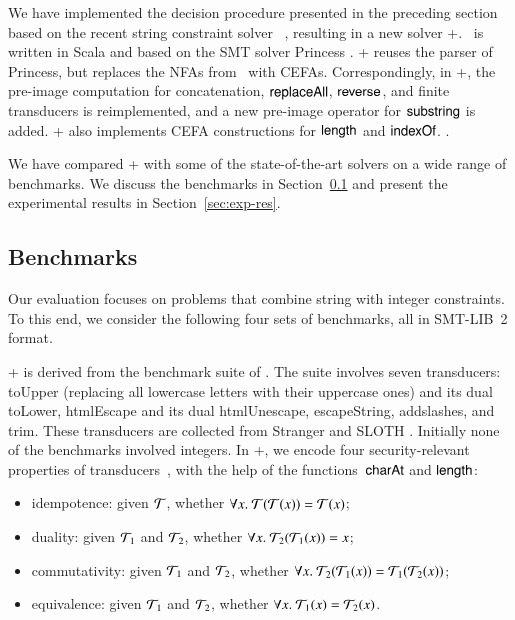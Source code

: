 
We have implemented the decision procedure presented in the preceding section based on the recent string constraint solver \ostrich~\cite{CHL+19}, resulting in a new solver \ostrich+. \ostrich\ is  written in Scala and based on the SMT solver Princess \cite{princess08}. \ostrich+ reuses the parser of Princess, but replaces the NFAs from \ostrich\ with CEFAs. Correspondingly, in \ostrich+, the pre-image  computation for concatenation, $\mathsf{replaceAll}$, $\mathsf{reverse}$, and finite transducers is reimplemented, and a new pre-image operator for $\mathsf{substring}$ is added. \ostrich+ also implements CEFA constructions for $\mathsf{length}$ and $\mathsf{indexOf}$.  \iftoggle{full}{More details can be found in Appendix~\ref{appendix:impl}}{More details can be found in the full version~\cite{atva20-full}}.

We have compared {\ostrich}+ with some of the state-of-the-art solvers on a wide range of benchmarks.  
We  discuss the benchmarks in Section~\ref{sec:bench} and %
present the experimental results in Section~\ref{sec:exp-res}.


\vspace{-4mm}
\subsection{Benchmarks}\label{sec:bench}
Our evaluation focuses on problems that combine string with integer constraints.  To this end, we consider the following four sets of
benchmarks, all in SMT-LIB~2 format.

\smallskip
\noindent \transducerbench+
is derived from the {\transducerbench} benchmark suite of {\ostrich}
\cite{CHL+19}.  The {\transducerbench} suite involves seven
transducers: toUpper (replacing all lowercase letters with their
uppercase ones) and its dual toLower, htmlEscape   and
its dual htmlUnescape, escapeString, addslashes, and trim. 
%
These transducers are
collected from Stranger \cite{YABI14} and SLOTH
\cite{HJLRV18}. Initially none of the benchmarks involved integers. In
{\transducerbench+}, we encode four security-relevant properties of
transducers~\cite{BEK}, with the help of the functions~$\mathsf{charAt}$ and
$\mathsf{length}$:
\begin{itemize}
\item idempotence: given $\mathcal{T}$, whether
  $\forall x.\ \mathcal{T}(\mathcal{T}(x)) = \mathcal{T}(x)$;
\item duality: given $\mathcal{T}_1$ and
  $\mathcal{T}_2$, whether $\forall x.\ \mathcal{T}_2(\mathcal{T}_1(x)) = x$;
\item commutativity: given $\mathcal{T}_1$ and $\mathcal{T}_2$, whether
  $\forall x.\ \mathcal{T}_2(\mathcal{T}_1(x)) = \mathcal{T}_1(\mathcal{T}_2(x))$;
\item equivalence: given $\mathcal{T}_1$ and $\mathcal{T}_2$, whether
  $\forall x.\ \mathcal{T}_1(x) = \mathcal{T}_2(x)$.
\end{itemize}

